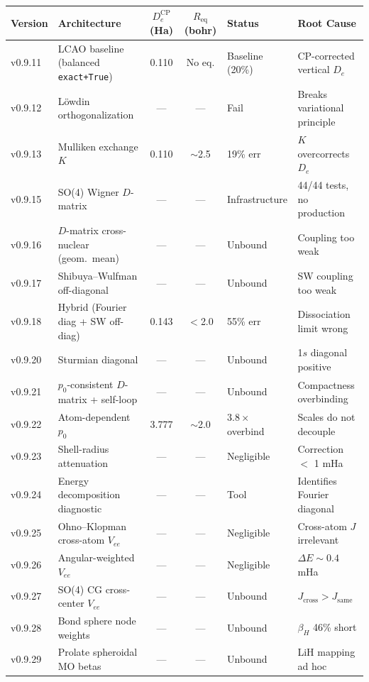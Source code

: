 \documentclass[aps,pra,twocolumn,superscriptaddress,longbibliography]{revtex4-2}
\begin{document}
\begin{table}[t]
\centering
\small
\begin{tabular}{llccll}
\toprule
Version & Architecture & $D_e^{\mathrm{CP}}$ (Ha) & $R_{\mathrm{eq}}$ (bohr)
& Status & Root Cause \\
\midrule
v0.9.11 & LCAO baseline (balanced \texttt{exact+True})
  & 0.110 & No eq. & Baseline (20\%) & CP-corrected vertical $D_e$ \\
v0.9.12 & L\"owdin orthogonalization
  & --- & --- & Fail & Breaks variational principle \\
v0.9.13 & Mulliken exchange $K$
  & 0.110 & $\sim$2.5 & 19\% err & $K$ overcorrects $D_e$ \\
v0.9.15 & SO(4) Wigner $D$-matrix
  & --- & --- & Infrastructure & 44/44 tests, no production \\
v0.9.16 & $D$-matrix cross-nuclear (geom.\ mean)
  & --- & --- & Unbound & Coupling too weak \\
v0.9.17 & Shibuya--Wulfman off-diagonal
  & --- & --- & Unbound & SW coupling too weak \\
v0.9.18 & Hybrid (Fourier diag + SW off-diag)
  & 0.143 & $<$2.0 & 55\% err & Dissociation limit wrong \\
v0.9.20 & Sturmian diagonal
  & --- & --- & Unbound & 1$s$ diagonal positive \\
v0.9.21 & $p_0$-consistent $D$-matrix + self-loop
  & --- & --- & Unbound & Compactness overbinding \\
v0.9.22 & Atom-dependent $p_0$
  & 3.777 & $\sim$2.0 & $3.8\times$ overbind & Scales do not decouple \\
v0.9.23 & Shell-radius attenuation
  & --- & --- & Negligible & Correction $<$ 1 mHa \\
v0.9.24 & Energy decomposition diagnostic
  & --- & --- & Tool & Identifies Fourier diagonal \\
v0.9.25 & Ohno--Klopman cross-atom $V_{ee}$
  & --- & --- & Negligible & Cross-atom $J$ irrelevant \\
v0.9.26 & Angular-weighted $V_{ee}$
  & --- & --- & Negligible & $\Delta E \sim 0.4$ mHa \\
v0.9.27 & SO(4) CG cross-center $V_{ee}$
  & --- & --- & Unbound & $J_{\mathrm{cross}} > J_{\mathrm{same}}$ \\
v0.9.28 & Bond sphere node weights
  & --- & --- & Unbound & $\beta_H$ 46\% short \\
v0.9.29 & Prolate spheroidal MO betas
  & --- & --- & Unbound & LiH mapping ad hoc \\

\end{tabular}
\end{table}
\end{document}
